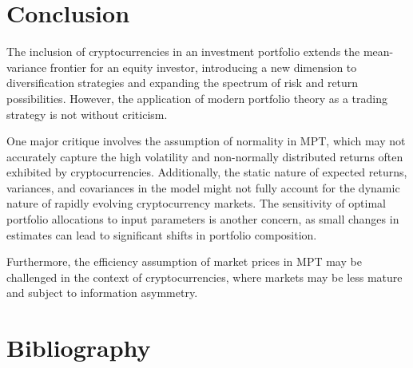 \documentclass[12pt,a4paper]{article}
\begin{document}
\section{Conclusion}\label{sec:discussion}
The inclusion of cryptocurrencies in an investment portfolio extends the mean-variance frontier for an equity investor, 
introducing a new dimension to diversification strategies and expanding the spectrum of risk and return possibilities. 
However, the application of modern portfolio theory as a trading strategy is not without criticism. 

\noindent One major critique involves the assumption of normality in MPT, which may not accurately capture the high volatility 
and non-normally distributed returns often exhibited by cryptocurrencies. Additionally, the static nature of expected returns,
 variances, and covariances in the model might not fully account for the dynamic nature of rapidly evolving cryptocurrency 
 markets. The sensitivity of optimal portfolio allocations to input parameters is another concern, as small changes in 
 estimates can lead to significant shifts in portfolio composition.

\noindent Furthermore, the efficiency assumption of market prices in MPT may be challenged in the context of cryptocurrencies,
 where markets may be less mature and subject to information asymmetry.

\section{Bibliography}\label{sec:bibliography}



\end{document}
